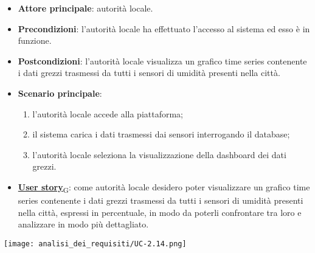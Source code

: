 \begin{itemize}
	\item \textbf{Attore principale}: autorità locale.
	\item \textbf{Precondizioni}: l'autorità locale ha effettuato l'accesso al sistema ed esso è in funzione.
	\item \textbf{Postcondizioni}: l'autorità locale visualizza un grafico time series contenente i dati grezzi trasmessi da tutti i sensori
	      di umidità presenti nella città.
	\item \textbf{Scenario principale}:
	      \begin{enumerate}
		      \item l'autorità locale accede alla piattaforma;
		      \item il sistema carica i dati trasmessi dai sensori interrogando il database;
		      \item l'autorità locale seleziona la visualizzazione della dashboard dei dati grezzi.
	      \end{enumerate}
	\item \href{https://7last.github.io/docs/pb/documentazione-interna/glossario\#user-story}{\textbf{User story}\textsubscript{G}}:
	      come autorità locale desidero poter visualizzare un grafico time series contenente i dati grezzi trasmessi da tutti i sensori
	      di umidità presenti nella città, espressi in percentuale, in modo da poterli confrontare tra loro e analizzare in modo più dettagliato.
\end{itemize}
\begin{center}
	\texttt{[image: analisi\_dei\_requisiti/UC-2.14.png]}
\end{center}


